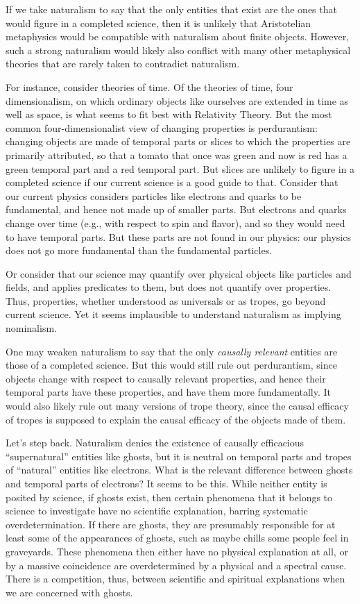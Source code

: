 If we take naturalism to say that the only entities that exist are the ones that would figure in a completed science,
then it is unlikely that Aristotelian metaphysics would be compatible with naturalism about finite objects. However,
such a strong naturalism would likely also conflict with many other metaphysical theories that are rarely taken to 
contradict naturalism. 

For instance, consider theories of time. Of the theories of time, four dimensionalism, on which
ordinary objects like ourselves are extended in time as well as space, is what seems to fit best with Relativity Theory. 
But the most common four-dimensionalist view of changing properties is perdurantism: changing objects are made of temporal parts or
slices to which the properties are primarily attributed, so that a tomato that once was green and now is red has a green temporal part
and a red temporal part. But slices are unlikely to figure in a completed science if
our current science is a good guide to that. Consider that our current physics considers particles
like electrons and quarks to be fundamental, and hence not made up of smaller parts. But electrons and quarks change over
time (e.g., with respect to spin and flavor), and so they would need to have temporal parts.  But these parts are not found
in our physics: our physics does not go more fundamental than the fundamental particles.

Or consider that our science may quantify over physical objects like particles and fields, and applies predicates to them, but 
does not quantify over properties. Thus, properties, whether understood as universals or as tropes, go beyond current science.
Yet it seems implausible to understand naturalism as implying nominalism.

One may weaken naturalism to say that the only \textit{causally relevant} entities are those of a completed science. But 
this would still rule out perdurantism, since objects change with respect to causally relevant properties, and hence their
temporal parts have these properties, and have them more fundamentally. It would also likely rule out many versions of trope
theory, since the causal efficacy of tropes is supposed to explain the causal efficacy of the objects made of them.

Let's step back. Naturalism denies the existence of causally efficacious ``supernatural'' entities like 
ghosts, but it is neutral on temporal parts and tropes of ``natural'' entities like electrons. 
What is the relevant difference between ghosts and temporal parts of electrons? It seems to be this. While
neither entity is posited by science, if ghosts exist, then certain phenomena that it belongs to science 
to investigate have no scientific explanation, barring systematic overdetermination. If there are ghosts,
they are presumably responsible for at least some of the appearances of ghosts, such as maybe chills some 
people feel in graveyards. These phenomena then either have no physical explanation at all, or by a massive
coincidence are overdetermined by a physical and a spectral cause. There is a competition, thus, between 
scientific and spiritual explanations when we are concerned with ghosts. 

